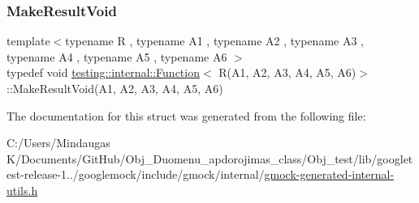 \subsubsection{\texorpdfstring{MakeResultVoid}{MakeResultVoid}}
{\footnotesize\ttfamily template$<$typename R , typename A1 , typename A2 , typename A3 , typename A4 , typename A5 , typename A6 $>$ \\
typedef void \mbox{\hyperlink{structtesting_1_1internal_1_1_function}{testing\+::internal\+::\+Function}}$<$ R(A1, A2, A3, A4, A5, A6)$>$\+::Make\+Result\+Void(A1, A2, A3, A4, A5, A6)}



The documentation for this struct was generated from the following file\+:\begin{DoxyCompactItemize}
\item 
C\+:/\+Users/\+Mindaugas K/\+Documents/\+Git\+Hub/\+Obj\+\_\+\+Duomenu\+\_\+apdorojimas\+\_\+class/\+Obj\+\_\+test/lib/googletest-\/release-\/1../googlemock/include/gmock/internal/\mbox{\hyperlink{gmock-generated-internal-utils_8h}{gmock-\/generated-\/internal-\/utils.\+h}}\end{DoxyCompactItemize}
